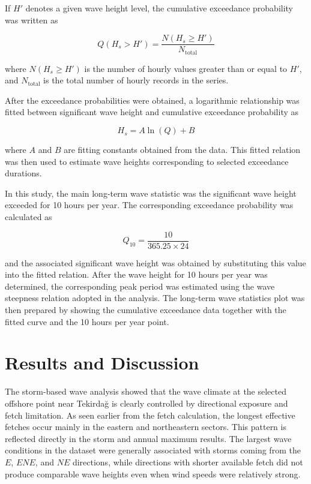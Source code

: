 \documentclass[a4paper, 11pt]{article}
\begin{document}
If \(H'\) denotes a given wave height level, the cumulative exceedance probability was written as

\[
Q(H_s > H') = \frac{N(H_s \geq H')}{N_{\mathrm{total}}}
\]

where \(N(H_s \geq H')\) is the number of hourly values greater than or equal to \(H'\), and \(N_{\mathrm{total}}\) is the total number of hourly records in the series.

After the exceedance probabilities were obtained, a logarithmic relationship was fitted between significant wave height and cumulative exceedance probability as

\[
H_s = A \ln(Q) + B
\]

where \(A\) and \(B\) are fitting constants obtained from the data. This fitted relation was then used to estimate wave heights corresponding to selected exceedance durations.

In this study, the main long-term wave statistic was the significant wave height exceeded for 10 hours per year. The corresponding exceedance probability was calculated as

\[
Q_{10} = \frac{10}{365.25 \times 24}
\]

and the associated significant wave height was obtained by substituting this value into the fitted relation. After the wave height for 10 hours per year was determined, the corresponding peak period was estimated using the wave steepness relation adopted in the analysis. The long-term wave statistics plot was then prepared by showing the cumulative exceedance data together with the fitted curve and the 10 hours per year point.

\section{Results and Discussion}

\hspace{0.5cm}The storm-based wave analysis showed that the wave climate at the selected offshore point near Tekirdağ is clearly controlled by directional exposure and fetch limitation. As seen earlier from the fetch calculation, the longest effective fetches occur mainly in the eastern and northeastern sectors. This pattern is reflected directly in the storm and annual maximum results. The largest wave conditions in the dataset were generally associated with storms coming from the \(E\), \(ENE\), and \(NE\) directions, while directions with shorter available fetch did not produce comparable wave heights even when wind speeds were relatively strong.
\end{document}
